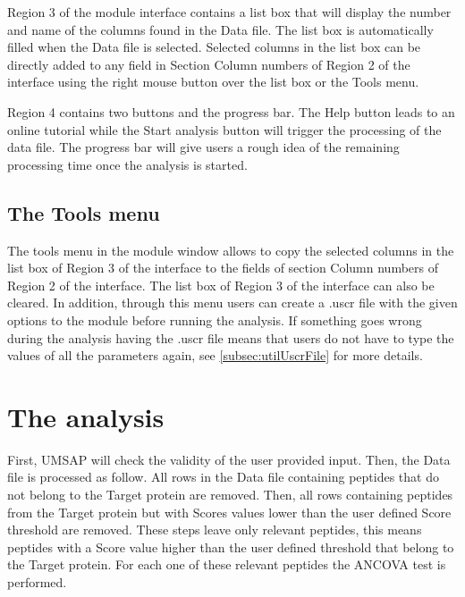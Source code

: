 Region \num{3} of the module interface contains a list box that will display the number and name of the columns found in the Data file. The list box is automatically filled when the Data file is selected. Selected columns in the list box can be directly added to any field in Section Column numbers of Region \num{2} of the interface using the right mouse button over the list box or the Tools menu.

Region \num{4} contains two buttons and the progress bar. The Help button leads to an online tutorial while the Start analysis button will trigger the processing of the data file. The progress bar will give users a rough idea of the remaining processing time once the analysis is started.

\subsection{The Tools menu}

The tools menu in the module window allows to copy the selected columns in the list box of Region \num{3} of the interface to the fields of section Column numbers of Region \num{2} of the interface. The list box of Region \num{3} of the interface can also be cleared. In addition, through this menu users can create a .uscr file with the given options to the module before running the analysis. If something goes wrong during the analysis having the .uscr file means that users do not have to type the values of all the parameters again, see \autoref{subsec:utilUscrFile} for more details.   

\section{The analysis}

First, UMSAP will check the validity of the user provided input. Then, the Data file is processed as follow. All rows in the Data file containing peptides that do not belong to the Target protein are removed. Then, all rows containing peptides from the Target protein but with Scores values lower than the user defined Score threshold are removed. These steps leave only relevant peptides, this means peptides with a Score value higher than the user defined threshold that belong to the Target protein. For each one of these relevant peptides the ANCOVA test is performed. 

